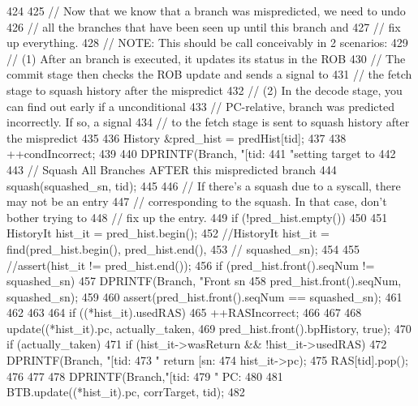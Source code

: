 \begin{DoxyCode}
424 {
425     // Now that we know that a branch was mispredicted, we need to undo
426     // all the branches that have been seen up until this branch and
427     // fix up everything.
428     // NOTE: This should be call conceivably in 2 scenarios:
429     // (1) After an branch is executed, it updates its status in the ROB
430     //     The commit stage then checks the ROB update and sends a signal to
431     //     the fetch stage to squash history after the mispredict
432     // (2) In the decode stage, you can find out early if a unconditional
433     //     PC-relative, branch was predicted incorrectly. If so, a signal
434     //     to the fetch stage is sent to squash history after the mispredict
435 
436     History &pred_hist = predHist[tid];
437 
438     ++condIncorrect;
439 
440     DPRINTF(Branch, "[tid:%
441             "setting target to %
442 
443     // Squash All Branches AFTER this mispredicted branch
444     squash(squashed_sn, tid);
445 
446     // If there's a squash due to a syscall, there may not be an entry
447     // corresponding to the squash.  In that case, don't bother trying to
448     // fix up the entry.
449     if (!pred_hist.empty()) {
450 
451         HistoryIt hist_it = pred_hist.begin();
452         //HistoryIt hist_it = find(pred_hist.begin(), pred_hist.end(),
453         //                       squashed_sn);
454 
455         //assert(hist_it != pred_hist.end());
456         if (pred_hist.front().seqNum != squashed_sn) {
457             DPRINTF(Branch, "Front sn %
458                     pred_hist.front().seqNum, squashed_sn);
459 
460             assert(pred_hist.front().seqNum == squashed_sn);
461         }
462 
463 
464         if ((*hist_it).usedRAS) {
465             ++RASIncorrect;
466         }
467 
468         update((*hist_it).pc, actually_taken,
469                pred_hist.front().bpHistory, true);
470         if (actually_taken) {
471             if (hist_it->wasReturn && !hist_it->usedRAS) {
472                  DPRINTF(Branch, "[tid: %
473                          "  return [sn:%
474                          hist_it->pc);
475                  RAS[tid].pop();
476             }
477 
478             DPRINTF(Branch,"[tid: %
479                     " PC: %
480 
481             BTB.update((*hist_it).pc, corrTarget, tid);
482 
}}}
\end{DoxyCode}
